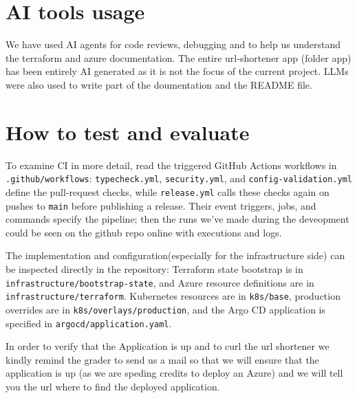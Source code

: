 \documentclass[10pt,a4paper]{article}
\newcommand{\file}[1]{\texttt{\nolinkurl{#1}}}
\begin{document}
\section{AI tools usage}
We have used AI agents for code reviews, debugging and to help us understand the terraform and azure documentation. 
The entire url-shortener app (folder app) has been entirely AI generated as it is not the focus of the current project. 
LLMs were also used to write part of the doumentation and the README file.

\section{How to test and evaluate}
To examine CI in more detail, read the triggered GitHub Actions workflows in \file{.github/workflows}: \file{typecheck.yml}, \file{security.yml}, and \file{config-validation.yml} define the pull-request checks, while \file{release.yml} calls these checks again on pushes to \texttt{main} before publishing a release.
Their event triggers, jobs, and commands specify the pipeline; then the runs we've made during the deveopment could be seen on the github repo online with executions and logs.

The implementation and configuration(especially for the infrastructure side) can be inspected directly in the repository: Terraform state bootstrap is in \file{infrastructure/bootstrap-state}, and Azure resource definitions are in \file{infrastructure/terraform}.
Kubernetes resources are in \file{k8s/base}, production overrides are in \file{k8s/overlays/production}, and the Argo CD application is specified in \file{argocd/application.yaml}.

In order to verify that the Application is up and to curl the url shortener we kindly remind the grader to send us a mail
so that we will ensure that the application is up (as we are speding credits to deploy an Azure) and we will tell you the url where to find the deployed application.
\end{document}
